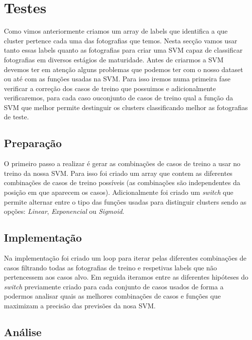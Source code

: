 \section{Testes}

Como vimos anteriormente criamos um array de labels que identifica a que cluster pertence cada uma das fotografias que temos. Nesta secção vamos usar tanto essas labels quanto as fotografias para criar uma SVM capaz de classificar fotografias em diversos estágios de maturidade. \newline
Antes de criarmos a SVM devemos ter em atenção alguns problemas que podemos ter com o nosso dataset ou até com as funções usadas na SVM. Para isso iremos numa primeira fase verificar a correção dos casos de treino que possuimos e adicionalmente verificaremos, para cada caso ouconjunto de casos de treino qual a função da SVM que melhor permite destinguir os clusters classificando melhor as fotografias de teste.

\subsection{Preparação}

O primeiro passo a realizar é gerar as combinações de casos de treino a usar no treino da nossa SVM. Para isso foi criado um array que contem as diferentes combinações de casos de treino possíveis (as combinações são independentes da posição em que aparecem os casos).\newline
Adicionalmente foi criado um \textit{switch} que permite alternar entre o tipo das funções usadas para distinguir clusters sendo as opções: \textit{Linear}, \textit{Exponencial} ou \textit{Sigmoid}.

\subsection{Implementação}

Na implementação foi criado um loop para iterar pelas diferentes combinações de casos filtrando todas as fotografias de treino e respetivas labels que não pertencessem aos casos alvo. Em seguida iteramos entre as diferentes hipóteses do \textit{switch} previamente criado para cada conjunto de casos usados de forma a podermos analisar quais as melhores combinações de casos e funções que maximizam a precisão das previsões da nosa SVM.

\subsection{Análise}


